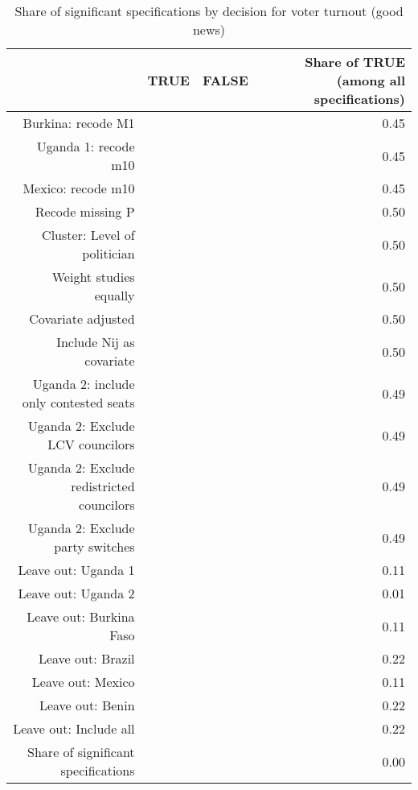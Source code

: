 \begin{table}[ht]
\centering
\caption{Share of significant specifications by decision for voter turnout (good news)} 
\label{tab:spec_m3g}
\begin{tabular}{rrrr}
  \hline
 & TRUE & FALSE & Share of TRUE (among all specifications) \\ 
  \hline
Burkina: recode M1 &  &  & 0.45 \\ 
  Uganda 1: recode m10 &  &  & 0.45 \\ 
  Mexico: recode m10 &  &  & 0.45 \\ 
  Recode missing P &  &  & 0.50 \\ 
  Cluster: Level of politician &  &  & 0.50 \\ 
  Weight studies equally &  &  & 0.50 \\ 
  Covariate adjusted &  &  & 0.50 \\ 
  Include Nij as covariate &  &  & 0.50 \\ 
  Uganda 2: include only contested seats &  &  & 0.49 \\ 
  Uganda 2: Exclude LCV councilors &  &  & 0.49 \\ 
  Uganda 2: Exclude redistricted councilors &  &  & 0.49 \\ 
  Uganda 2: Exclude party switches &  &  & 0.49 \\ 
  Leave out: Uganda 1 &  &  & 0.11 \\ 
  Leave out: Uganda 2 &  &  & 0.01 \\ 
  Leave out: Burkina Faso &  &  & 0.11 \\ 
  Leave out: Brazil &  &  & 0.22 \\ 
  Leave out: Mexico &  &  & 0.11 \\ 
  Leave out: Benin &  &  & 0.22 \\ 
  Leave out: Include all &  &  & 0.22 \\ 
  Share of significant specifications &  &  & 0.00 \\ 
   \hline
\end{tabular}
\end{table}
